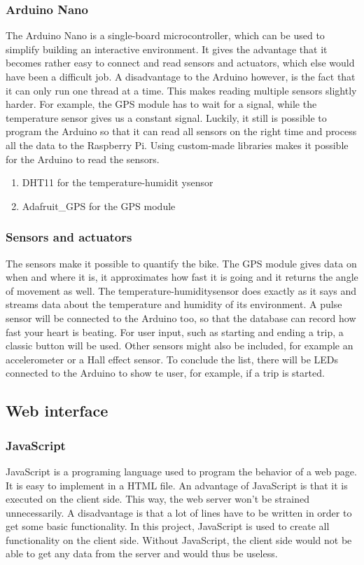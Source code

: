 \subsubsection{Arduino Nano}
The Arduino Nano is a single-board microcontroller, which can be used to simplify building an interactive environment. It gives the advantage that it becomes rather easy to connect and read sensors and actuators, which else would have been a difficult job. A disadvantage to the Arduino however, is the fact that it can only run one thread at a time. This makes reading multiple sensors slightly harder. For example, the GPS module has to wait for a signal, while the temperature sensor gives us a constant signal. Luckily, it still is possible to program the Arduino so that it can read all sensors on the right time and process all the data to the Raspberry Pi.
Using custom-made libraries makes it possible for the Arduino to read the sensors.
\begin{enumerate}
 \item DHT11 for the temperature-humidit ysensor
 \item Adafruit\_GPS for the GPS module
\end{enumerate}

\subsubsection{Sensors and actuators}
The sensors make it possible to quantify the bike. The GPS module gives data on when and where it is, it approximates how fast it is going and it returns the angle of movement as well. The temperature-humiditysensor does exactly as it says and streams data about the temperature and humidity of its environment. A pulse sensor will be connected to the Arduino too, so that the database can record how fast your heart is beating. For user input, such as starting and ending a trip, a classic button will be used. Other sensors might also be included, for example an accelerometer or a Hall effect sensor. To conclude the list, there will be LEDs connected to the Arduino to show te user, for example, if a trip is started.

\subsection{Web interface}
\subsubsection{JavaScript}
JavaScript is a programing language used to program the behavior of a web page.
It is easy to implement in a HTML file. An advantage of JavaScript is that it is
executed on the client side. This way, the web server won't be strained unnecessarily.
A disadvantage is that a lot of lines have to be written in order to get some basic
functionality. In this project, JavaScript is used to create all functionality on the
client side. Without JavaScript, the client side would not be able to get any data from
the server and would thus be useless. 

